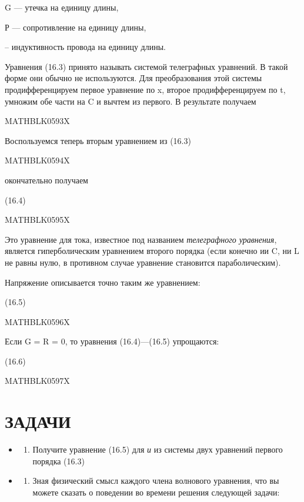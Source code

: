 \documentclass[
]{article}
\providecommand{\tightlist}{%
  \setlength{\itemsep}{0pt}\setlength{\parskip}{0pt}}
\begin{document}
G --- утечка на единицу длины,

Р --- сопротивление на единицу длины,

-- индуктивность провода на единицу длины.

Уравнения (16.3) принято называть системой телеграфных уравнений. В
такой форме они обычно не используются. Для преобразования этой системы
продифференцируем первое уравнение по x, второе продифференцируем по t,
умножим обе части на C и вычтем из первого. В результате получаем

MATHBLK0593X

Воспользуемся теперь вторым уравнением из (16.3)

MATHBLK0594X

окончательно получаем

(16.4)

MATHBLK0595X

Это уравнение для тока, известное под названием \emph{телеграфного
уравнения}, является гиперболическим уравнением второго порядка (если
конечно ии C, ни L не равны нулю, в противном случае уравнение
становится параболическим).

Напряжение описывается точно таким же уравнением:

(16.5)

MATHBLK0596X

Если G = R = 0, то уравнения (16.4)---(16.5) упрощаются:

(16.6)

MATHBLK0597X

\section{ЗАДАЧИ}\label{ux437ux430ux434ux430ux447ux438-2}

\begin{itemize}
\tightlist
\item
  \begin{enumerate}
  \def\labelenumi{\arabic{enumi}.}
  \tightlist
  \item
    Получите уравнение (16.5) для \emph{и} из системы двух уравнений
    первого порядка (16.3)
  \end{enumerate}
\item
  \begin{enumerate}
  \def\labelenumi{\arabic{enumi}.}
  \setcounter{enumi}{1}
  \tightlist
  \item
    Зная физический смысл каждого члена волнового уравнения, что вы
    можете сказать о поведении во времени решения следующей задачи:
  \end{enumerate}
\end{itemize}
\end{document}
